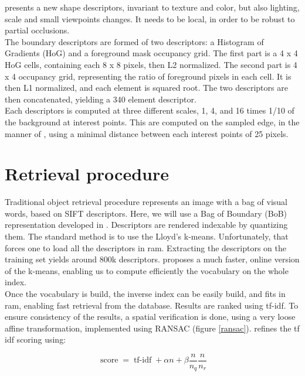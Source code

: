 \documentclass{article}
\DeclareMathOperator{\score}{score}
\DeclareMathOperator{\tfidf}{tf-idf}
\begin{document}

\cite{Arandjelovic11} presents a new shape descriptors, invariant to texture
and color, but also lighting, scale and small viewpoints changes. It needs to
be local, in order to be robust to partial occlusions. \\
The boundary descriptors are formed of two descriptors: a Histogram of
Gradients (HoG) and a foreground mask occupancy grid. The first part is a
4 x 4 HoG cells, containing each 8 x 8 pixels, then L2 normalized. The second
part is 4 x 4 occupancy grid, representing the ratio of foreground pixels in
each cell. It is then L1 normalized, and each element is squared root. The two
descriptors are then concatenated, yielding a 340 element descriptor. \\
Each descriptors is computed at three different scales, 1, 4, and 16 times
1/10 of the background at interest points. This are computed  on the sampled
edge, in the manner of \cite{BelongieMP02}, using a minimal distance between
each interest points of 25 pixels.

\section{Retrieval procedure}

Traditional object retrieval procedure represents an image with a bag of
visual words, based on SIFT descriptors. Here, we will use a Bag of Boundary
(BoB) representation developed in \cite{Arandjelovic11}. Descriptors are
rendered indexable by quantizing them. The standard method is to use the
Lloyd's k-means. Unfortunately, that forces one to load all the descriptors in
ram. Extracting the descriptors on the training set yields around 800k
descriptors. \cite{fast-k-means} proposes a much faster, online version of
the k-means, enabling us to compute efficiently the vocabulary on the whole
index. \\
Once the vocabulary is build, the inverse index can be easily build, and fits
in ram, enabling fast retrieval from the database. Results are ranked using
tf-idf. To ensure consistency of the results, a spatial verification is done,
using a very loose affine transformation, implemented using RANSAC (figure
\ref{ransac}). \cite{Arandjelovic11} refines the tf idf scoring using:

\begin{equation*}
\score = \tfidf + \alpha n + \beta \frac{n}{n_q} \frac{n}{n_r}
\end{equation*}
\end{document}
